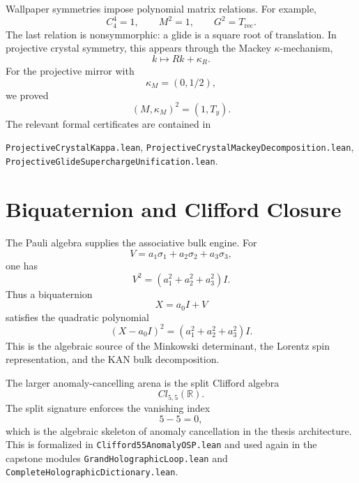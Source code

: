 Wallpaper symmetries impose polynomial matrix relations.  For example,
\begin{equation}
    C_4^4=1,
    \qquad
    M^2=1,
    \qquad
    G^2=T_{\mathrm{rec}}.
\end{equation}
The last relation is nonsymmorphic: a glide is a square root of translation.  In projective crystal symmetry, this appears through the Mackey $\kappa$-mechanism,
\begin{equation}
    k\mapsto Rk+\kappa_R.
\end{equation}
For the projective mirror with
\begin{equation}
    \kappa_M=(0,1/2),
\end{equation}
we proved
\begin{equation}
    (M,\kappa_M)^2=(1,T_y).
\end{equation}
The relevant formal certificates are contained in
\begin{center}
\texttt{ProjectiveCrystalKappa.lean},\quad
\texttt{ProjectiveCrystalMackeyDecomposition.lean},\quad
\texttt{ProjectiveGlideSuperchargeUnification.lean}.
\end{center}

\section{Biquaternion and Clifford Closure}

The Pauli algebra supplies the associative bulk engine.  For
\begin{equation}
    V=a_1\sigma_1+a_2\sigma_2+a_3\sigma_3,
\end{equation}
one has
\begin{equation}
    V^2=(a_1^2+a_2^2+a_3^2)I.
\end{equation}
Thus a biquaternion
\begin{equation}
    X=a_0I+V
\end{equation}
satisfies the quadratic polynomial
\begin{equation}
    (X-a_0I)^2=(a_1^2+a_2^2+a_3^2)I.
\end{equation}
This is the algebraic source of the Minkowski determinant, the Lorentz spin representation, and the KAN bulk decomposition.

The larger anomaly-cancelling arena is the split Clifford algebra
\begin{equation}
    Cl_{5,5}(\mathbb{R}).
\end{equation}
The split signature enforces the vanishing index
\begin{equation}
    5-5=0,
\end{equation}
which is the algebraic skeleton of anomaly cancellation in the thesis architecture.  This is formalized in \texttt{Clifford55AnomalyOSP.lean} and used again in the capstone modules \texttt{GrandHolographicLoop.lean} and \texttt{CompleteHolographicDictionary.lean}.

